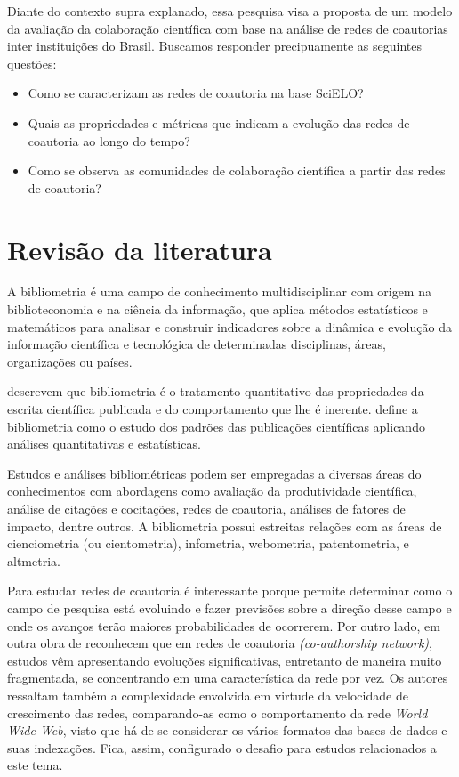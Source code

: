 Diante do contexto supra explanado, essa pesquisa visa a proposta de um modelo da avaliação da colaboração científica com base na análise de redes de coautorias inter instituições do Brasil. 
Buscamos responder precipuamente as seguintes questões:
\begin{itemize}
\item Como se caracterizam as redes de coautoria na base SciELO?
\item Quais as propriedades e métricas que indicam a evolução das redes de coautoria ao longo do tempo?
\item Como se observa as comunidades de colaboração científica a partir das redes de coautoria?
\end{itemize}  
    
\section{\textbf{Revisão da literatura}}\label{Revisão}

A bibliometria é uma campo de conhecimento multidisciplinar com origem na biblioteconomia e na ciência da informação, que aplica métodos estatísticos e matemáticos para analisar e construir indicadores sobre a dinâmica e evolução da informação científica e tecnológica de determinadas disciplinas, áreas, organizações ou países.

\citep{pritchard1969statistical} descrevem que bibliometria é o tratamento quantitativo das propriedades da escrita científica publicada e do comportamento que lhe é inerente. 
\citep{osareh1996bibliometrics} define a bibliometria como o estudo dos padrões das publicações científicas aplicando análises quantitativas e estatísticas. %

Estudos e análises bibliométricas podem ser empregadas a diversas áreas do conhecimentos com abordagens como avaliação da produtividade científica, análise de citações e cocitações, redes de coautoria, análises de fatores de impacto, dentre outros. A bibliometria possui estreitas relações com as áreas de cienciometria (ou cientometria), infometria, webometria, patentometria, e altmetria.

Para \citep{Barabasi2001} estudar redes de coautoria é interessante porque permite determinar como o campo de pesquisa está evoluindo e fazer previsões sobre a direção desse campo e onde os avanços terão maiores probabilidades de ocorrerem. Por outro lado, em outra obra de \citep{barabasi2003everything} reconhecem que em redes de coautoria \textit{(co-authorship network)}, estudos vêm apresentando evoluções significativas, entretanto de maneira muito fragmentada, se concentrando em uma característica da rede por vez. 
Os autores ressaltam também a complexidade envolvida em virtude da velocidade de crescimento das redes, comparando-as como o comportamento da rede \textit{World Wide Web}, visto que há de se considerar os vários formatos das bases de dados e suas indexações. Fica, assim, configurado o desafio para estudos relacionados a este tema.
    
